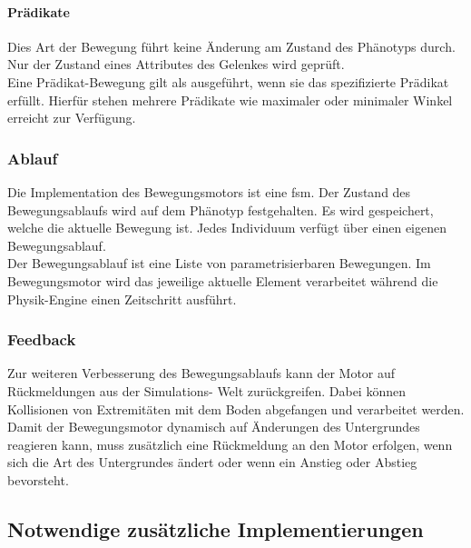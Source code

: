         \paragraph{Prädikate\label{EngineMovementsPredicates}}

          Dies Art der Bewegung führt keine Änderung am Zustand des Phänotyps durch.
          Nur der Zustand eines Attributes des Gelenkes wird geprüft.
          \\
          Eine Prädikat-Bewegung gilt als ausgeführt, wenn sie das spezifizierte Prädikat erfüllt.
          Hierfür stehen mehrere Prädikate wie maximaler oder minimaler Winkel erreicht zur Verfügung.

      \subsubsection{Ablauf}

        Die Implementation des Bewegungsmotors ist eine \acrfull{fsm}.
        Der Zustand des Bewegungsablaufs wird auf dem Phänotyp festgehalten.
        Es wird gespeichert, welche die aktuelle Bewegung ist.
        Jedes Individuum verfügt über einen eigenen Bewegungsablauf.
        \\
        Der Bewegungsablauf ist eine Liste von parametrisierbaren Bewegungen.
        Im Bewegungsmotor wird das jeweilige aktuelle Element verarbeitet
        während die Physik-Engine einen Zeitschritt ausführt.

      \subsubsection{Feedback}

        Zur weiteren Verbesserung des Bewegungsablaufs kann der Motor auf Rückmeldungen aus der Simulations-
        Welt zurückgreifen.
        Dabei können Kollisionen von Extremitäten mit dem Boden abgefangen und verarbeitet werden.
        \\
        Damit der Bewegungsmotor dynamisch auf Änderungen des Untergrundes reagieren kann,
        muss zusätzlich eine Rückmeldung an den Motor erfolgen, wenn sich die Art des Untergrundes ändert
        oder wenn ein Anstieg oder Abstieg bevorsteht.
        \\

    \subsection{Notwendige zusätzliche Implementierungen}

